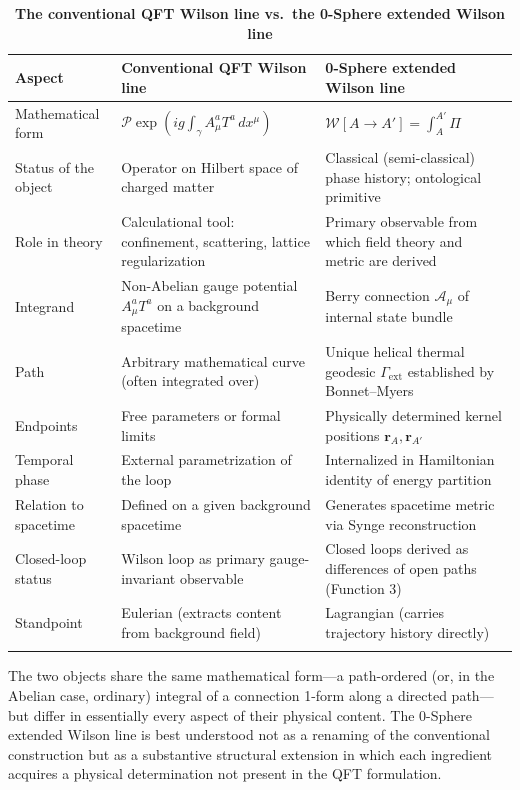 \documentclass[%
 reprint, amsmath,amssymb, aps, prb, ]{revtex4-2}
\numberwithin{equation}{section}
\newcommand{\WL}{\mathcal{W}}
\begin{document}
\begin{table}[t!]
\centering
\caption{\textbf{The conventional QFT Wilson line vs.\ the 0-Sphere extended Wilson line}}
\label{tab:term_compare}
\renewcommand{\arraystretch}{1.4}
\begin{tabular}{p{3.0cm}p{6.0cm}p{6.0cm}}
\toprule
\textbf{Aspect} & \textbf{Conventional QFT Wilson line} & \textbf{0-Sphere extended Wilson line} \\
\midrule
Mathematical form
& $\mathcal{P}\exp\!\left(ig\int_\gamma A_\mu^a T^a\,dx^\mu\right)$
& $\WL[A\to A'] = \int_A^{A'}\Pi$ \\
\addlinespace[0.3cm]
Status of the object
& Operator on Hilbert space of charged matter
& Classical (semi-classical) phase history; ontological primitive \\
\addlinespace[0.3cm]
Role in theory
& Calculational tool: confinement, scattering, lattice regularization
& Primary observable from which field theory and metric are derived \\
\addlinespace[0.3cm]
Integrand
& Non-Abelian gauge potential $A_\mu^a T^a$ on a background spacetime
& Berry connection $\mathcal{A}_\mu$ of internal state bundle~\cite{hanamura26, hanamura51} \\
\addlinespace[0.3cm]
Path
& Arbitrary mathematical curve (often integrated over)
& Unique helical thermal geodesic $\Gamma_{\text{ext}}$ established by Bonnet--Myers~\cite{hanamura51} \\
\addlinespace[0.3cm]
Endpoints
& Free parameters or formal limits
& Physically determined kernel positions $\mathbf{r}_A, \mathbf{r}_{A'}$~\cite{hanamura43} \\
\addlinespace[0.3cm]
Temporal phase
& External parametrization of the loop
& Internalized in Hamiltonian identity of energy partition~\cite{hanamura01} \\
\addlinespace[0.3cm]
Relation to spacetime
& Defined on a given background spacetime
& Generates spacetime metric via Synge reconstruction~\cite{hanamura51} \\
\addlinespace[0.3cm]
Closed-loop status
& Wilson loop as primary gauge-invariant observable
& Closed loops derived as differences of open paths (Function 3) \\
\addlinespace[0.3cm]
Standpoint
& Eulerian (extracts content from background field)
& Lagrangian (carries trajectory history directly) \\
\addlinespace[0.2cm]
\bottomrule
\end{tabular}
\vspace{0.2cm}
\begin{minipage}{0.95\textwidth}
\justifying\footnotesize
The two objects share the same mathematical form---a path-ordered (or, in the Abelian case, ordinary) integral of a connection 1-form along a directed path---but differ in essentially every aspect of their physical content. The 0-Sphere extended Wilson line is best understood not as a renaming of the conventional construction but as a substantive structural extension in which each ingredient acquires a physical determination not present in the QFT formulation.
\end{minipage}
\end{table}
\end{document}
